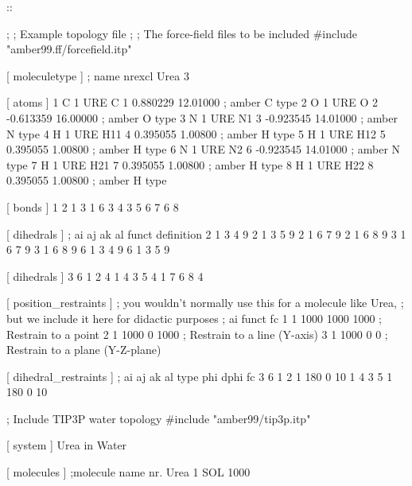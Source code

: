 ::

    ;
    ;       Example topology file
    ;
    ; The force-field files to be included
    #include "amber99.ff/forcefield.itp"

    [ moleculetype ]
    ; name  nrexcl
    Urea         3

    [ atoms ]
       1  C  1  URE      C      1     0.880229  12.01000   ; amber C  type
       2  O  1  URE      O      2    -0.613359  16.00000   ; amber O  type
       3  N  1  URE     N1      3    -0.923545  14.01000   ; amber N  type
       4  H  1  URE    H11      4     0.395055   1.00800   ; amber H  type
       5  H  1  URE    H12      5     0.395055   1.00800   ; amber H  type
       6  N  1  URE     N2      6    -0.923545  14.01000   ; amber N  type
       7  H  1  URE    H21      7     0.395055   1.00800   ; amber H  type
       8  H  1  URE    H22      8     0.395055   1.00800   ; amber H  type

    [ bonds ]
        1	2
        1	3	
        1   6
        3	4
        3	5
        6	7
        6	8

    [ dihedrals ] 
    ;   ai    aj    ak    al funct  definition
         2     1     3     4   9     
         2     1     3     5   9     
         2     1     6     7   9     
         2     1     6     8   9     
         3     1     6     7   9     
         3     1     6     8   9     
         6     1     3     4   9     
         6     1     3     5   9     

    [ dihedrals ] 
         3     6     1     2   4     
         1     4     3     5   4	 
         1     7     6     8   4

    [ position_restraints ]
    ; you wouldn't normally use this for a molecule like Urea,
    ; but we include it here for didactic purposes
    ; ai   funct    fc
       1     1     1000    1000    1000 ; Restrain to a point
       2     1     1000       0    1000 ; Restrain to a line (Y-axis)
       3     1     1000       0       0 ; Restrain to a plane (Y-Z-plane)

    [ dihedral_restraints ]
    ; ai   aj    ak    al  type  phi  dphi  fc
        3    6     1    2     1  180     0  10
        1    4     3    5     1  180     0  10

    ; Include TIP3P water topology
    #include "amber99/tip3p.itp"

    [ system ]
    Urea in Water

    [ molecules ]
    ;molecule name   nr.
    Urea             1
    SOL              1000

